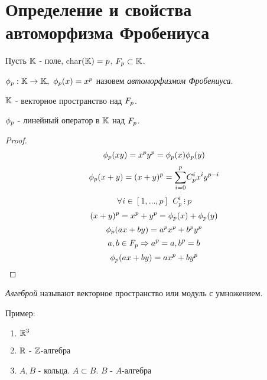 \section{Определение и свойства автоморфизма Фробениуса}

Пусть $ \mathbb{K} $ - поле, char$(\mathbb{K}) = p $,  $ F_{p} \subset \mathbb{K} $.

\begin{defn}
  $ \phi_{p} : \mathbb{K} \rightarrow \mathbb{K}, ~ \phi_{p}(x) = x^p $ назовем \emph{автоморфизмом Фробениуса}. 
\end{defn}

$ \mathbb{K} $ - векторное пространство над $ F_{p} $.

\begin{thm}
  $ \phi_{p} $ - линейный оператор в $ \mathbb{K} $ над $ F_{p} $.
\end{thm}

\begin{proof}
     \[ \phi_{p}(xy) = x^py^p = \phi_{p}(x)\phi_{p}(y) \]
     \[ \phi_{p}(x + y) = (x + y)^p = \underset{i = 0}{\overset{p}\sum}C_{p}^{i}x^{i}y^{p-i} \] 
     \[ \forall i \in [1,\dots,p] ~~  C_{p}^{i} ~ \vdots ~ p \]  
     \[ (x+y)^p = x^p + y^p = \phi_{p}(x) + \phi_{p}(y) \] \newline
     \[ \phi_{p}(ax + by) = a^px^p + b^py^p \]
     \[ a, b \in F_{p} \Rightarrow a^p = a, b^p = b \]
     \[ \phi_{p}(ax + by) = ax^p + by^p \]
\end{proof}

\begin{defn}
  \emph{Алгеброй} называют векторное пространство или модуль с умножением.
\end{defn}

Пример:

\begin{enumerate}
  \item $ \mathbb{R}^3 $
  \item $ \mathbb{R} $ - $\mathbb{Z}$-алгебра
  \item $ A, B $ - кольца. $ A \subset B $. $ B $ - $A$-алгебра
\end{enumerate}


